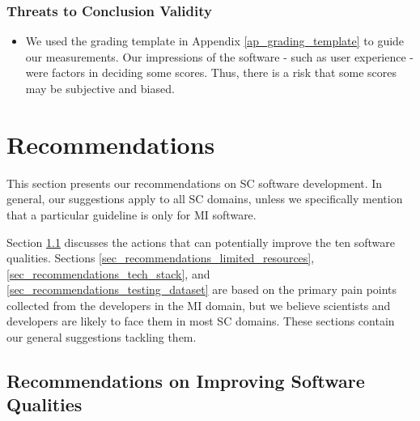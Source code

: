 \documentclass[preprint,12pt,authoryear]{elsarticle}
\begin{document}
\subsubsection{Threats to Conclusion Validity}
\begin{itemize}
\item We used the grading template in Appendix \ref{ap_grading_template} to
guide our measurements. Our impressions of the software - such as user
experience - were factors in deciding some scores. Thus, there is a risk that
some scores may be subjective and biased.
\end{itemize}

\section{Recommendations} \label{ch_recommendations}

This section presents our recommendations on SC software development. In
general, our suggestions apply to all SC domains, unless we specifically mention
that a particular guideline is only for MI software.

Section \ref{sec_recommendations_qualities} discusses the actions that can
potentially improve the ten software qualities. Sections
\ref{sec_recommendations_limited_resources},
\ref{sec_recommendations_tech_stack}, and
\ref{sec_recommendations_testing_dataset} are based on the primary pain points
collected from the developers in the MI domain, but we believe scientists and
developers are likely to face them in most SC domains. These sections contain
our general suggestions tackling them. 

\subsection{Recommendations on Improving Software Qualities} \label{sec_recommendations_qualities}
\end{document}
